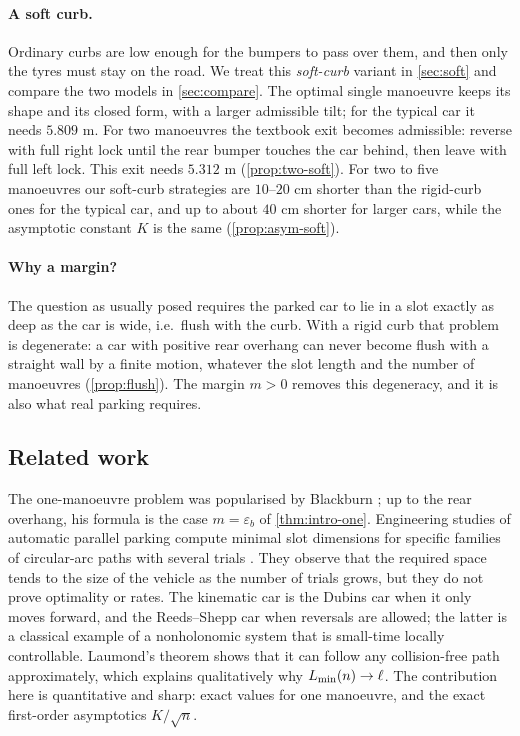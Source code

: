 \paragraph{A soft curb.}
Ordinary curbs are low enough for the bumpers to pass over them, and then only the tyres must stay on the road.
We treat this \emph{soft-curb} variant in \cref{sec:soft} and compare the two models in \cref{sec:compare}.
The optimal single manoeuvre keeps its shape and its closed form, with a larger admissible tilt; for the typical car it needs $5.809$ m.
For two manoeuvres the textbook exit becomes admissible: reverse with full right lock until the rear bumper touches the car behind, then leave with full left lock.
This exit needs $5.312$ m (\cref{prop:two-soft}).
For two to five manoeuvres our soft-curb strategies are $10$--$20$ cm shorter than the rigid-curb ones for the typical car, and up to about $40$ cm shorter for larger cars, while the asymptotic constant $K$ is the same (\cref{prop:asym-soft}).

\paragraph{Why a margin?}
The question as usually posed requires the parked car to lie in a slot exactly as deep as the car is wide, i.e.\ flush with the curb.
With a rigid curb that problem is degenerate: a car with positive rear overhang can never become flush with a straight wall by a finite motion, whatever the slot length and the number of manoeuvres (\cref{prop:flush}).
The margin $m>0$ removes this degeneracy, and it is also what real parking requires.

\subsection{Related work}
The one-manoeuvre problem was popularised by Blackburn \cite{Blackburn}; up to the rear overhang, his formula is the case $m=\varepsilon_b$ of \cref{thm:intro-one}.
Engineering studies of automatic parallel parking compute minimal slot dimensions for specific families of circular-arc paths with several trials \cite{WangEtAl,Vorobieva}.
They observe that the required space tends to the size of the vehicle as the number of trials grows, but they do not prove optimality or rates.
The kinematic car is the Dubins car \cite{Dubins} when it only moves forward, and the Reeds--Shepp car \cite{ReedsShepp} when reversals are allowed; the latter is a classical example of a nonholonomic system that is small-time locally controllable.
Laumond's theorem \cite{Laumond} shows that it can follow any collision-free path approximately, which explains qualitatively why $L_{\min}(n)\to\ell$.
The contribution here is quantitative and sharp: exact values for one manoeuvre, and the exact first-order asymptotics $K/\sqrt n$.

